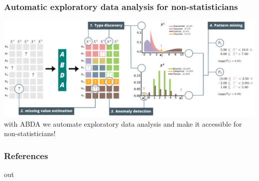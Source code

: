 \documentclass[xcolor={usenames,dvipsnames,svgnames}, compress, aspectratio=169, 11pt]{beamer}
\begin{document}
\begin{frame}[t, htt=mpigreen]
  \frametitle{Automatic exploratory data analysis for non-statisticians}

  \includegraphics[width=1.04\linewidth]{figures/abda-full}\\

  with ABDA we automate exploratory data analysis and make it
  accessible for non-statisticians!
  
\end{frame}



 
\begin{frame}[allowframebreaks]
  \frametitle{References}
  \setlength\bibitemsep{8pt}
  \printbibliography
\end{frame}

out
\end{document}
